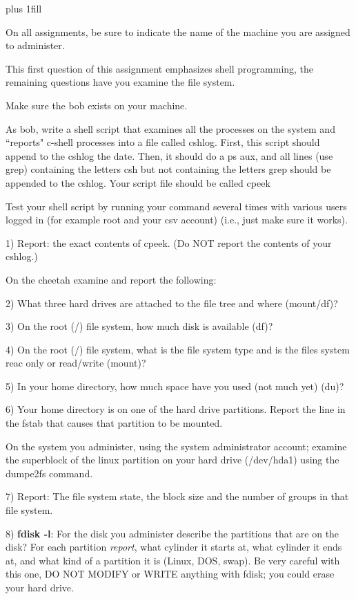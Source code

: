 
\rightskip=0pt plus 1fill

\parindent 0pt

On all assignments, be sure to indicate the name of the
machine you are assigned to administer.

This first question of this assignment emphasizes shell programming,
the remaining questions have you examine the file system.

Make sure the {\ltt{}bob} exists on your 
machine.

As bob, write a shell script that examines all the processes on the
system and ``reports" c-shell processes
into a file called {\ltt{}cshlog}.
First, this script should append to the {\ltt{}cshlog} the {\ltt{}date}.
Then, it should do a {\ltt{}ps aux}, and all lines (use {\ltt{}grep})
containing the letters csh but not containing the letters grep
should be appended to the {\ltt{}cshlog}.
Your script file should be called {\ltt{}cpeek}

Test your shell script by
running your command several times with various users logged 
in (for example root and your csv account)
(i.e., just make sure it works).

1) Report: the exact contents of {\ltt{}cpeek}.
(Do NOT report the contents of your cshlog.)

On the {\ltt{}cheetah} examine and report the following:

2) What three hard drives are attached to the file tree and where (mount/df)?

3) On the root ({\ltt{}/}) file system, how much disk is available (df)?

4) On the root ({\ltt{}/}) file system, what is the file system type
and is the files system reac only or read/write (mount)?

5) In your home directory, how much space have you used (not much yet) (du)?

6) Your home directory is on one of the hard drive partitions.
Report the line in the {\ltt{}fstab} that causes that partition
to be mounted.

On the system you administer, using the system administrator account;
examine the superblock of the linux partition on your hard drive
({\ltt{}/dev/hda1}) using the {\ltt{}dumpe2fs} command.

7) Report: The file system state, the block size and the number of groups
in that file system.

8) {\bf fdisk -l}:
For the disk you administer describe the partitions that are on the disk?
For each partition {\it report}, what cylinder it starts at,
what cylinder it ends at,
and what kind of a partition it is (Linux, DOS, swap).
Be very careful with this one, 
DO NOT MODIFY or WRITE anything with fdisk; 
you could erase your hard drive.

\bye
